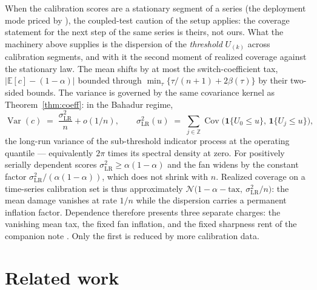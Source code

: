 \documentclass[11pt]{article}
\begin{document}
When the calibration scores are a stationary segment of a series (the deployment mode priced by \citealp{barberpananjady2026}), the coupled-test caution of the setup applies: the coverage
statement for the next step of the same series is theirs, not ours. What the machinery above
supplies is the dispersion of the \emph{threshold} $U_{(k)}$ across calibration segments, and
with it the second moment of realized coverage against the stationary law. The mean shifts by at most the switch-coefficient tax,
$|\mathbb E[c]-(1-\alpha)|$ bounded through $\min_\tau\{\tau/(n+1)+2\beta(\tau)\}$ by their two-sided
bounds. The variance is governed by the same covariance kernel as Theorem~\ref{thm:coeff}: in the
Bahadur regime,
\[
\operatorname{Var}(c)\;=\;\frac{\sigma^2_{\mathrm{LR}}}{n}+o(1/n),
\qquad
\sigma^2_{\mathrm{LR}}(u)\;=\;\sum_{j\in\mathbb Z}\operatorname{Cov}\bigl(\mathbf 1\{U_0\le
u\},\,\mathbf 1\{U_j\le u\}\bigr),
\]
the long-run variance of the sub-threshold indicator process at the operating quantile ---
equivalently $2\pi$ times its spectral density at zero. For positively serially dependent scores
$\sigma^2_{\mathrm{LR}}\ge\alpha(1-\alpha)$ and the fan widens by the constant factor
$\sigma^2_{\mathrm{LR}}/(\alpha(1-\alpha))$, which does not shrink with $n$. Realized coverage on
a time-series calibration set is thus approximately
$\mathcal N\!\bigl(1-\alpha-\text{tax},\ \sigma^2_{\mathrm{LR}}/n\bigr)$: the mean damage
vanishes at rate $1/n$ while the dispersion carries a permanent inflation factor. Dependence
therefore presents three separate charges: the vanishing mean tax, the fixed fan inflation, and the fixed sharpness rent of the companion note \citep{cotton_twoprices}. Only the first is reduced by more calibration data.

\section{Related work}
\end{document}
